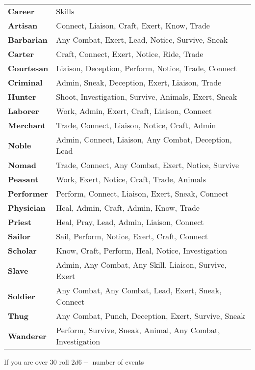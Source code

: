\documentclass[itdr/core]{subfiles}
\begin{document}
\begin{longtable}{l l}
\hline
\textbf{Career} & Skills \\
    \textbf{Artisan} & Connect, Liaison, Craft, Exert, Know, Trade \\
    \textbf{Barbarian} & Any Combat, Exert, Lead, Notice, Survive, Sneak \\
    \textbf{Carter} & Craft, Connect, Exert, Notice, Ride, Trade \\
    \textbf{Courtesan} & Liaison, Deception, Perform, Notice, Trade, Connect \\
    \textbf{Criminal} & Admin, Sneak, Deception, Exert, Liaison, Trade \\
    \textbf{Hunter} & Shoot, Investigation, Survive, Animals, Exert, Sneak \\
    \textbf{Laborer} & Work, Admin, Exert, Craft, Liaison, Connect \\
    \textbf{Merchant} & Trade, Connect, Liaison, Notice, Craft, Admin \\
    \textbf{Noble} & Admin, Connect, Liaison, Any Combat, Deception, Lead \\
    \textbf{Nomad} & Trade, Connect, Any Combat, Exert, Notice, Survive \\
    \textbf{Peasant} & Work, Exert, Notice, Craft, Trade, Animals \\
    \textbf{Performer} & Perform, Connect, Liaison, Exert, Sneak, Connect \\
    \textbf{Physician} & Heal, Admin, Craft, Admin, Know, Trade \\
    \textbf{Priest} & Heal, Pray, Lead, Admin, Liaison, Connect \\ 
    \textbf{Sailor} & Sail, Perform, Notice, Exert, Craft, Connect \\ 
    \textbf{Scholar} & Know, Craft, Perform, Heal, Notice, Investigation \\
    \textbf{Slave} & Admin, Any Combat, Any Skill, Liaison, Survive, Exert \\ 
    \textbf{Soldier} & Any Combat, Any Combat, Lead, Exert, Sneak, Connect \\ 
    \textbf{Thug} & Any Combat, Punch, Deception, Exert, Survive, Sneak \\
    \textbf{Wanderer} & Perform, Survive, Sneak, Animal, Any Combat, Investigation \\
\hline
\end{longtable}

If you are over $30$ roll $2d6-$ number of events
\end{document}
